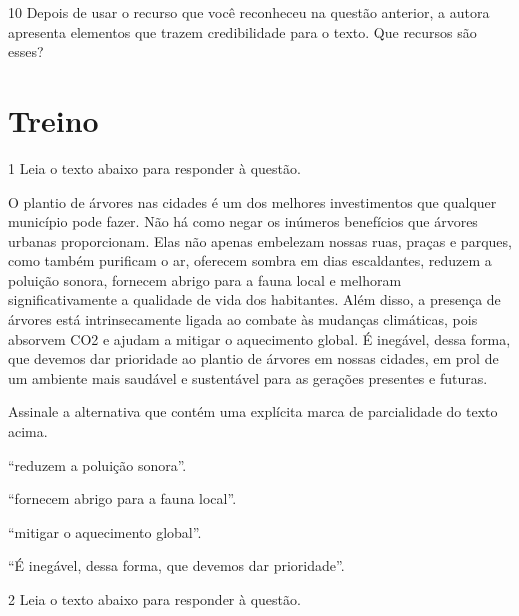 \num{10} Depois de usar o recurso que você reconheceu na questão anterior, a 
autora apresenta elementos que trazem credibilidade para o texto. Que recursos
são esses? 


\section*{Treino}

\num{1} Leia o texto abaixo para responder à questão.

\begin{myquote}
O plantio de árvores nas cidades é um dos melhores investimentos que qualquer 
município pode fazer. Não há como negar os inúmeros benefícios que árvores urbanas 
proporcionam. Elas não apenas embelezam nossas ruas, praças e parques, como também purificam
o ar, oferecem sombra em dias escaldantes, reduzem a poluição sonora, fornecem
abrigo para a fauna local e melhoram significativamente a qualidade de vida
dos habitantes. Além disso, a presença de árvores está intrinsecamente ligada
ao combate às mudanças climáticas, pois absorvem CO2 e ajudam a mitigar o
aquecimento global. É inegável, dessa forma, que devemos dar prioridade ao plantio
de árvores em nossas cidades, em prol de um ambiente mais saudável e
sustentável para as gerações presentes e futuras.


\end{myquote}

\pagebreak
Assinale a alternativa que contém uma explícita marca de parcialidade do texto acima.

\begin{escolha}

  \item ``reduzem a poluição sonora''.
  \item ``fornecem abrigo para a fauna local''.
  \item ``mitigar o aquecimento global''.
  \item ``É inegável, dessa forma, que devemos dar prioridade''. 

\end{escolha}

\num{2} Leia o texto abaixo para responder à questão.

